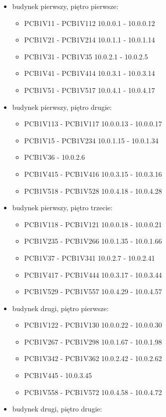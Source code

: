 \documentclass[a4paper, 12pt]{article}
\begin{document}
\begin{itemize}
\item budynek pierwszy, piętro pierwsze:
	\begin{itemize}
	\item PCB1V11 - PCB1V112 10.0.0.1 - 10.0.0.12
	\item PCB1V21 - PCB1V214 10.0.1.1 - 10.0.1.14
	\item PCB1V31 - PCB1V35 10.0.2.1 - 10.0.2.5
	\item PCB1V41 - PCB1V414 10.0.3.1 - 10.0.3.14
	\item PCB1V51 - PCB1V517 10.0.4.1 - 10.0.4.17
	\end{itemize}
\item budynek pierwszy, piętro drugie:
	\begin{itemize}
	\item PCB1V113 - PCB1V117 10.0.0.13 - 10.0.0.17
	\item PCB1V15 - PCB1V234 10.0.1.15 - 10.0.1.34
	\item PCB1V36 - 10.0.2.6
	\item PCB1V415 - PCB1V416 10.0.3.15 - 10.0.3.16
	\item PCB1V518 - PCB1V528 10.0.4.18 - 10.0.4.28
	\end{itemize}
\item budynek pierwszy, piętro trzecie:
	\begin{itemize}
	\item PCB1V118 - PCB1V121 10.0.0.18 - 10.0.0.21
	\item PCB1V235 - PCB1V266 10.0.1.35 - 10.0.1.66
	\item PCB1V37 - PCB1V341 10.0.2.7 - 10.0.2.41
	\item PCB1V417 - PCB1V444 10.0.3.17 - 10.0.3.44
	\item PCB1V529 - PCB1V557 10.0.4.29 - 10.0.4.57
	\end{itemize}
\item budynek drugi, piętro pierwsze:
	\begin{itemize}
	\item PCB1V122 - PCB1V130 10.0.0.22 - 10.0.0.30
	\item PCB1V267 - PCB1V298 10.0.1.67 - 10.0.1.98
	\item PCB1V342 - PCB1V362 10.0.2.42 - 10.0.2.62
	\item PCB1V445 - 10.0.3.45
	\item PCB1V558 - PCB1V572 10.0.4.58 - 10.0.4.72
	\end{itemize}
\item budynek drugi, piętro drugie:

\end{itemize}
\end{document}
